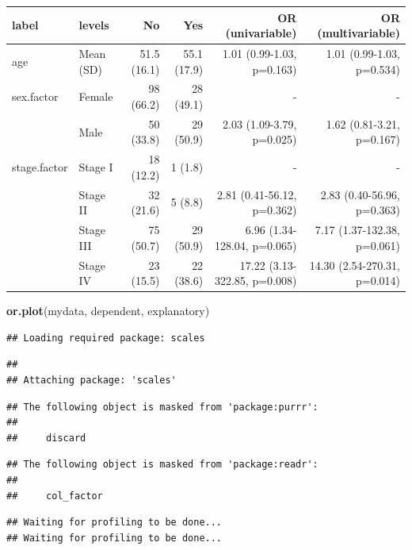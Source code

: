 \documentclass[]{book}
\makeatletter
\newenvironment{Shaded}{\begin{snugshade}}{\end{snugshade}}
\newcommand{\KeywordTok}[1]{\textcolor[rgb]{0.13,0.29,0.53}{\textbf{#1}}}
\newcommand{\NormalTok}[1]{#1}
\newenvironment{kframe}{%
\medskip{}
\setlength{\fboxsep}{.8em}
 \def\at@end@of@kframe{}%
 \ifinner\ifhmode%
  \def\at@end@of@kframe{\end{minipage}}%
  \begin{minipage}{\columnwidth}%
 \fi\fi%
 \def\FrameCommand##1{\hskip\@totalleftmargin \hskip-\fboxsep
 \colorbox{shadecolor}{##1}\hskip-\fboxsep
     \hskip-\linewidth \hskip-\@totalleftmargin \hskip\columnwidth}%
 \MakeFramed {\advance\hsize-\width
   \@totalleftmargin\z@ \linewidth\hsize
   \@setminipage}}%
 {\par\unskip\endMakeFramed%
 \at@end@of@kframe}
\renewenvironment{Shaded}{\begin{kframe}}{\end{kframe}}
\theoremstyle{definition}
\theoremstyle{definition}
\theoremstyle{definition}
\theoremstyle{remark}
\makeatother
\begin{document}
\begin{tabular}{l|l|r|r|r|r}
\hline
label & levels & No & Yes & OR (univariable) & OR (multivariable)\\
\hline
age & Mean (SD) & 51.5 (16.1) & 55.1 (17.9) & 1.01 (0.99-1.03, p=0.163) & 1.01 (0.99-1.03, p=0.534)\\
\hline
sex.factor & Female & 98 (66.2) & 28 (49.1) & - & -\\
\hline
 & Male & 50 (33.8) & 29 (50.9) & 2.03 (1.09-3.79, p=0.025) & 1.62 (0.81-3.21, p=0.167)\\
\hline
stage.factor & Stage I & 18 (12.2) & 1 (1.8) & - & -\\
\hline
 & Stage II & 32 (21.6) & 5 (8.8) & 2.81 (0.41-56.12, p=0.362) & 2.83 (0.40-56.96, p=0.363)\\
\hline
 & Stage III & 75 (50.7) & 29 (50.9) & 6.96 (1.34-128.04, p=0.065) & 7.17 (1.37-132.38, p=0.061)\\
\hline
 & Stage IV & 23 (15.5) & 22 (38.6) & 17.22 (3.13-322.85, p=0.008) & 14.30 (2.54-270.31, p=0.014)\\
\hline
\end{tabular}

\begin{Shaded}
\begin{Highlighting}[]
\KeywordTok{or.plot}\NormalTok{(mydata, dependent, explanatory)}
\end{Highlighting}
\end{Shaded}

\begin{verbatim}
## Loading required package: scales
\end{verbatim}

\begin{verbatim}
## 
## Attaching package: 'scales'
\end{verbatim}

\begin{verbatim}
## The following object is masked from 'package:purrr':
## 
##     discard
\end{verbatim}

\begin{verbatim}
## The following object is masked from 'package:readr':
## 
##     col_factor
\end{verbatim}

\begin{verbatim}
## Waiting for profiling to be done...
## Waiting for profiling to be done...
\end{verbatim}
\end{document}
